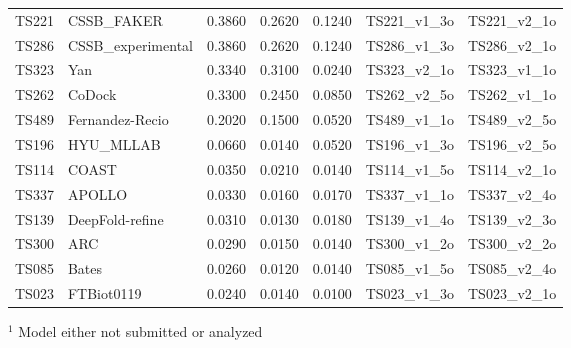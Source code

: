 \begin{table}[ht]
{\begin{tabular}{llrrrll}
TS221 & CSSB\_FAKER & 0.3860 & 0.2620 & 0.1240 & TS221\_v1\_3o & TS221\_v2\_1o \\ 
TS286 & CSSB\_experimental & 0.3860 & 0.2620 & 0.1240 & TS286\_v1\_3o & TS286\_v2\_1o \\ 
TS323 & Yan & 0.3340 & 0.3100 & 0.0240 & TS323\_v2\_1o & TS323\_v1\_1o \\ 
TS262 & CoDock & 0.3300 & 0.2450 & 0.0850 & TS262\_v2\_5o & TS262\_v1\_1o \\ 
TS489 & Fernandez-Recio & 0.2020 & 0.1500 & 0.0520 & TS489\_v1\_1o & TS489\_v2\_5o \\ 
TS196 & HYU\_MLLAB & 0.0660 & 0.0140 & 0.0520 & TS196\_v1\_3o & TS196\_v2\_5o \\ 
TS114 & COAST & 0.0350 & 0.0210 & 0.0140 & TS114\_v1\_5o & TS114\_v2\_1o \\ 
TS337 & APOLLO & 0.0330 & 0.0160 & 0.0170 & TS337\_v1\_1o & TS337\_v2\_4o \\ 
TS139 & DeepFold-refine & 0.0310 & 0.0130 & 0.0180 & TS139\_v1\_4o & TS139\_v2\_3o \\ 
TS300 & ARC & 0.0290 & 0.0150 & 0.0140 & TS300\_v1\_2o & TS300\_v2\_2o \\ 
TS085 & Bates & 0.0260 & 0.0120 & 0.0140 & TS085\_v1\_5o & TS085\_v2\_4o \\ 
TS023 & FTBiot0119 & 0.0240 & 0.0140 & 0.0100 & TS023\_v1\_3o & TS023\_v2\_1o \\ 
\bottomrule
\end{tabular}%
}
\begin{flushleft}\footnotesize $^{1}$ Model either not submitted or analyzed\end{flushleft}
\end{table}
